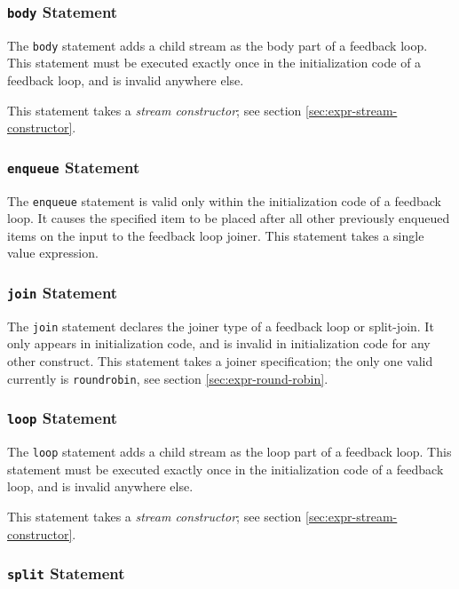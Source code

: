 \documentclass[11pt]{article}
\begin{document}
\subsubsection{\texttt{body} Statement}

The \texttt{body} statement adds a child stream as the body part of
a feedback loop.  This statement must be executed exactly once in the
initialization code of a feedback loop, and is invalid anywhere else.

This statement takes a \emph{stream constructor}; see section
\ref{sec:expr-stream-constructor}.

\subsubsection{\texttt{enqueue} Statement}

The \texttt{enqueue} statement is valid only within the
initialization code of a feedback loop.  It causes the specified item
to be placed after all other previously enqueued items on the input to
the feedback loop joiner.  This statement takes a single value
expression.

\subsubsection{\texttt{join} Statement}

The \texttt{join} statement declares the joiner type of a feedback
loop or split-join.  It only appears in initialization code, and is
invalid in initialization code for any other construct.  This
statement takes a joiner specification; the only one valid currently
is \texttt{roundrobin}, see section \ref{sec:expr-round-robin}.

\subsubsection{\texttt{loop} Statement}

The \texttt{loop} statement adds a child stream as the loop part of
a feedback loop.  This statement must be executed exactly once in the
initialization code of a feedback loop, and is invalid anywhere else.

This statement takes a \emph{stream constructor}; see section
\ref{sec:expr-stream-constructor}.

\subsubsection{\texttt{split} Statement}
\end{document}
